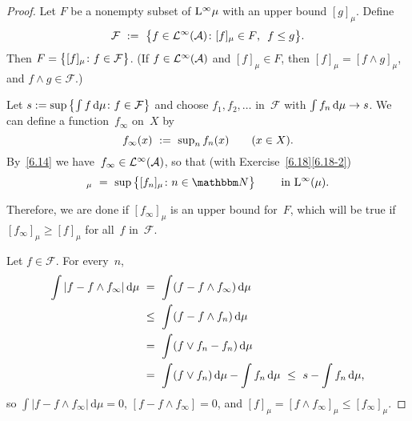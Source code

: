\documentclass[main.tex]{subfiles}
\begin{document}
\begin{proof}
Let $F$ be a nonempty subset of $\mathrm{L}^\infty{\mu}$
with an upper bound $[g]_\mu$.
Define
\begin{equation*}
\mathcal{F}\ :=\ \bigl\{ f\in\mathcal{L}^\infty(\mathcal{A})\colon
  [f]_\mu\in F\text{, }\ f\leq g\bigr\}\text{.}
\end{equation*}
Then $F=\smash{\bigl\{[f]_\mu\colon f\in\mathcal F\bigr\}}$.
(If $f\in\mathcal{L}^\infty(\mathcal A)$ and $[f]_\mu\in F$,
then $[f]_\mu = [f\wedge g]_\mu$,
and $f\wedge g\in\mathcal F$.)

Let $s:=\sup\smash{\bigl\{\int f\,\mathrm{d}\mu\colon
f\in\mathcal F\bigr\}}$ and choose $f_1,f_2,\dotsc$ in~$\mathcal F$
with $\int f_n\,\mathrm{d}\mu\rightarrow s$.
We can define a function~$f_\infty$ on~$X$ by
\begin{equation*}
f_\infty(x)\ :=\ \textstyle \sup_n f_n(x)\qquad(x\in X)\text{.}
\end{equation*}
By~\ref{6.14} we have~$f_\infty\in\mathcal{L}^\infty(\mathcal A)$,
so that (with Exercise~\ref{6.18}\ref{6.18-2})
\begin{equation*}
[f_\infty]_\mu\ =\ \sup\,\bigl\{[f_n]_\mu\colon n\in\N\bigr\}
\qquad\htam{ in }\BNL(\mu)\htam{.}
\end{equation*}

Therefore,
we are done if $[f_\infty]_\mu$
is an upper bound for~$F$,
which will be true if $[f_\infty]_\mu\geq [f]_\mu$
for all~$f$ in~$\mathcal F$.

Let $f\in\mathcal F$.
For every~$n$,
\begin{alignat*}{2}
\int |f-f\wedge f_\infty |\,\mathrm{d}\mu
\ &=\ \int (f-f\wedge f_\infty)\,\mathrm{d}\mu  \\
\ &\leq\ \int(f-f\wedge f_n)\,\mathrm{d}\mu \\
\ &=\ \int(f\vee f_n -f_n)\,\mathrm{d}\mu \\
\ &=\ \int(f\vee f_n)\,\mathrm{d}\mu 
      -\int f_n\,\mathrm{d}\mu
\ \leq\ s-\int f_n\,\mathrm{d}\mu\text{,}
\end{alignat*}
so $\int |f-f\wedge f_\infty|\,\mathrm{d}\mu=0$,
$[f-f\wedge f_\infty]=0$,
and $[f]_\mu= [f\wedge f_\infty]_\mu\leq [f_\infty]_\mu$. \xqed
\end{proof}
%
%
\end{document}
